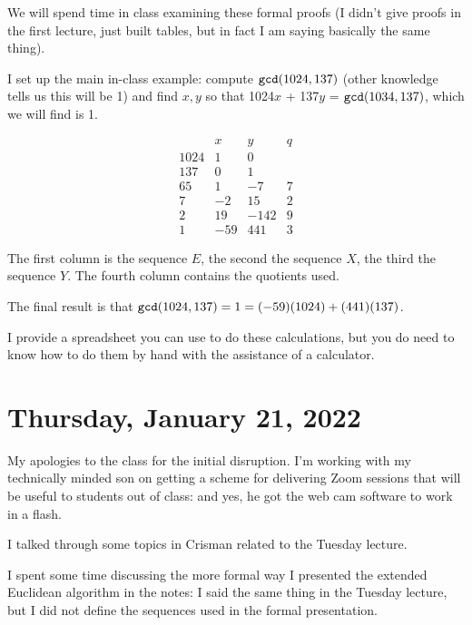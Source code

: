 \documentclass[12pt]{article}
\begin{document}
We will spend time in class examining these formal proofs (I didn't give proofs in the first lecture, just built tables, but in fact I am saying basically the same thing).

I set up the main in-class example:  compute ${\tt gcd}(1024,137)$ (other knowledge tells us this will be 1) and find $x,y$ so that
1024$x$ + 137$y$ = ${\tt gcd}(1034,137)$, which we will find is 1.

$$\begin{array}{c|c|c|c}

&x & y& q \\

1024 & 1&0 &\\

 137 & 0 & 1 &\\

 65 & 1 & -7 & 7\\

7 &-2 & 15& 2 \\

 2 &19 & -142& 9 \\

 1 &-59 & 441 & 3
\end{array}$$

The first column is the sequence $E$, the second the sequence $X$, the third the sequence $Y$.  The fourth column contains the quotients used.

The final result is that ${\tt gcd}(1024,137)= 1 = (-59)(1024)+(441)(137)$.

I provide a spreadsheet you can use to do these calculations, but you do need to know how to do them by hand with the assistance of a calculator.

\section{Thursday, January 21, 2022}

My apologies to the class for the initial disruption.  I'm working with my technically minded son on getting a scheme for delivering Zoom sessions that will be useful to students out of class:  and yes, he got the web cam software to work in a flash.

I talked through some topics in Crisman related to the Tuesday lecture.

I spent some time discussing the more formal way I presented the extended Euclidean algorithm in the notes:  I said the same thing in the Tuesday lecture, but I did not define the sequences used in the formal presentation.
\end{document}
